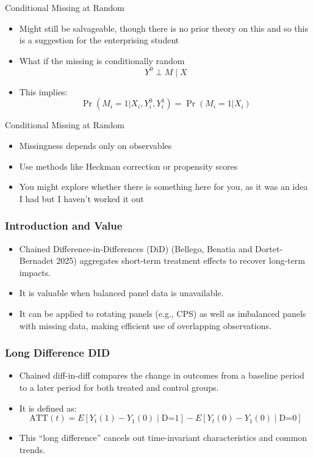 \documentclass{beamer}
\begin{document}
\begin{frame}{Conditional Missing at Random}
  \begin{itemize}
	\item Might still be salvageable, though there is no prior theory on this and so this is a suggestion for the enterprising student
	\item What if the missing is conditionally random $$Y^0 \perp M \mid X$$
    \item This implies:
    \[ \Pr(M_i = 1 | X_i, Y_i^0, Y_i^1) = \Pr(M_i = 1 | X_i) \]
  \end{itemize}
\end{frame}

\begin{frame}{Conditional Missing at Random}

\begin{itemize}
    \item Missingness depends only on observables
    \item Use methods like Heckman correction or propensity scores
    \item You might explore whether there is something here for you, as it was an idea I had but I haven't worked it out
\end{itemize}

\end{frame}

\begin{frame}
\frametitle{Introduction and Value}
\begin{itemize}
  \item Chained Difference-in-Differences (DiD) (Bellego, Benatia and Dortet-Bernadet 2025) aggregates short-term treatment effects to recover long-term impacts.
  \item It is valuable when balanced panel data is unavailable.
  \item It can be applied to rotating panels (e.g., CPS) as well as imbalanced panels with missing data, making efficient use of overlapping observations.
\end{itemize}
\end{frame}

\begin{frame}
\frametitle{Long Difference DID}
\begin{itemize}
  \item Chained diff-in-diff compares the change in outcomes from a baseline period to a later period for both treated and control groups.
  \item It is defined as: 
    \[
      \text{ATT}(t) = E[Y_t(1) - Y_1(0) \mid \text{D=1}] - E[Y_t(0) - Y_1(0) \mid \text{D=0}]
    \]
  \item This “long difference” cancels out time-invariant characteristics and common trends.
\end{itemize}
\end{frame}
\end{document}
